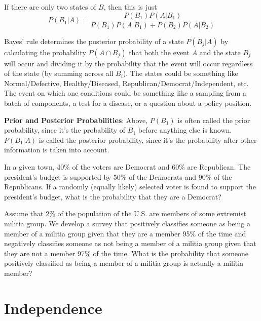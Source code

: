\documentclass[
]{book}
\begin{document}
If there are only two states of \(B\), then this is just
\[P(B_1|A)=\frac{P(B_1)P(A|B_1)} {P(B_1)P(A|B_1)+P(B_2)P(A|B_2)}\]

Bayes' rule determines the posterior probability of a state \(P(B_j|A)\) by calculating the probability \(P(A \cap B_j)\) that both the event \(A\) and the state \(B_j\) will occur and dividing it by the probability that the event will occur regardless of the state (by summing across all \(B_i\)). The states could be something like Normal/Defective, Healthy/Diseased, Republican/Democrat/Independent, etc. The event on which one conditions could be something like a sampling from a batch of components, a test for a disease, or a question about a policy position.

\textbf{Prior and Posterior Probabilities}: Above, \(P(B_1)\) is often called the prior probability, since it's the probability of \(B_1\) before anything else is known. \(P(B_1|A)\) is called the posterior probability, since it's the probability after other information is taken into account.

\begin{example}
\protect\hypertarget{exm:bayesrule}{}\label{exm:bayesrule}In a given town, 40\% of the voters are Democrat and 60\% are Republican. The president's budget is supported by 50\% of the Democrats and 90\% of the Republicans. If a randomly (equally likely) selected voter is found to support the president's budget, what is the probability that they are a Democrat?
\end{example}

\begin{exercise}
\protect\hypertarget{exr:condprobexr}{}\label{exr:condprobexr}Assume that 2\% of the population of the U.S. are members of some extremist militia group. We develop a survey that positively classifies someone as being a member of a militia group given that they are a member 95\% of the time and negatively classifies someone as not being a member of a militia group given that they are not a member 97\% of the time. What is the probability that someone positively classified as being a member of a militia group is actually a militia member?
\end{exercise}

\hypertarget{independence}{%
\section{Independence}\label{independence}}
\end{document}
